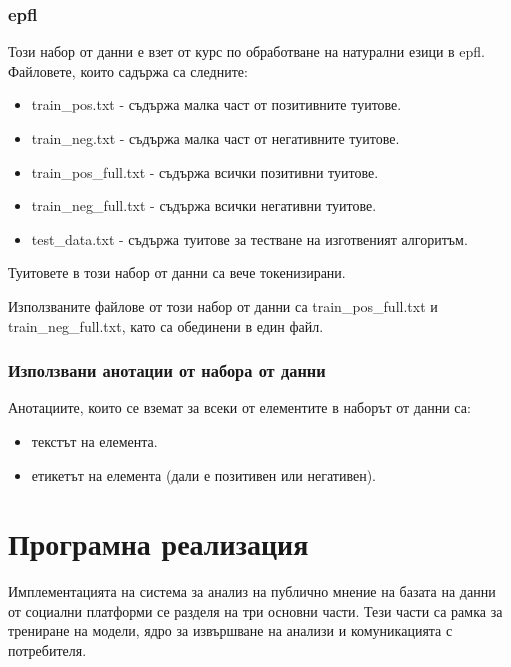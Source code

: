 \documentclass{article}
\begin{document}
\subsubsection{epfl}

Този набор от данни е взет от курс по обработване на натурални езици в epfl. Файловете, които садържа са следните:

\begin{itemize}

  \item train\_pos.txt - съдържа малка част от позитивните туитове.
  \item train\_neg.txt - съдържа малка част от негативните туитове.
  \item train\_pos\_full.txt - съдържа всички позитивни туитове.
  \item train\_neg\_full.txt - съдържа всички негативни туитове.
  \item test\_data.txt - съдържа туитове за тестване на изготвеният алгоритъм.

\end{itemize}

Туитовете в този набор от данни са вече токенизирани. \cite{epfl}

Използваните файлове от този набор от данни са train\_pos\_full.txt и train\_neg\_full.txt, като са обединени в един
файл.

\subsubsection{Използвани анотации от набора от данни}

Анотациите, които се вземат за всеки от елементите в наборът от данни са:

\begin{itemize}

  \item текстът на елемента.
  \item етикетът на елемента (дали е позитивен или негативен).

\end{itemize}

\newpage\section{Програмна реализация}

Имплементацията на система за анализ на публично мнение на базата на данни от социални платформи се разделя на три
основни части. Тези части са рамка за трениране на модели, ядро за извършване на анализи и комуникацията с потребителя.
\end{document}
